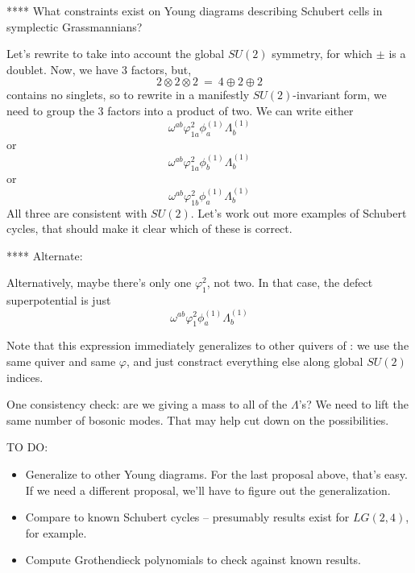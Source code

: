 \documentclass[12pt]{article}
\begin{document}
**** What constraints exist on Young diagrams describing Schubert cells
in symplectic Grassmannians?

Let's rewrite to take into account the global $SU(2)$ symmetry, for
which $\pm$ is a doublet.  Now, we have 3 factors, but, 
\begin{equation}
2 \otimes 2 \otimes 2 \: = \: 4 \oplus 2 \oplus 2
\end{equation}
contains no singlets, so to rewrite in a manifestly $SU(2)$-invariant
form, we need to group the 3 factors into a product of two.  We can write
either
\begin{equation}
\omega^{ab} \varphi_{1 a}^2 \phi_a^{(1)} \Lambda_b^{(1)}
\end{equation}
or
\begin{equation}
\omega^{ab} \varphi_{1 a}^2 \phi^{(1)}_b \Lambda_b^{(1)}
\end{equation}
or
\begin{equation}
\omega^{ab} \varphi_{1 b}^2 \phi^{(1)}_a \Lambda_b^{(1)}
\end{equation}
All three are consistent with $SU(2)$.  Let's work out more examples of
Schubert cycles, that should make it clear which of these is correct.

**** Alternate:

Alternatively, maybe there's only one $\varphi_1^2$, not two.
In that case, the defect superpotential is just
\begin{equation}
\omega^{ab} \varphi_1^2 \phi^{(1)}_a \Lambda^{(1)}_b
\end{equation}

Note that this expression immediately generalizes to other quivers of
\cite{Closset:2023bdr}:  we use the same quiver and same $\varphi$,
and just constract everything else along global $SU(2)$ indices.

One consistency check:  are we giving a mass to all of the $\Lambda$'s?
We need to lift the same number of bosonic modes.  That may help cut down
on the possibilities.




TO DO:
\begin{itemize}
\item Generalize to other Young diagrams.  For the last proposal above,
that's easy.  If we need a different proposal, we'll have to figure out the
generalization.
%
\item Compare to known Schubert cycles -- presumably results exist for
$LG(2,4)$, for example.
%
\item Compute Grothendieck polynomials to check against known results.
\end{itemize}
\end{document}
